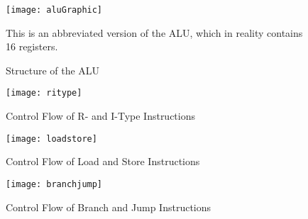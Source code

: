\documentclass[onecolumn, 12pt]{IEEEtran}
\begin{document}
\begin{figure}
\centering
\texttt{[image: aluGraphic]}
\caption{Structure of the ALU}
This is an abbreviated version of the ALU, which in reality contains 16 registers.
\end{figure}
\begin{figure}
\centering
\texttt{[image: ritype]}
\caption{Control Flow of R- and I-Type Instructions}
\end{figure}
\begin{figure}
\centering
\texttt{[image: loadstore]}
\caption{Control Flow of Load and Store Instructions}
\end{figure}
\begin{figure}
\centering
\texttt{[image: branchjump]}
\caption{Control Flow of Branch and Jump Instructions}
\end{figure}
\end{document}
